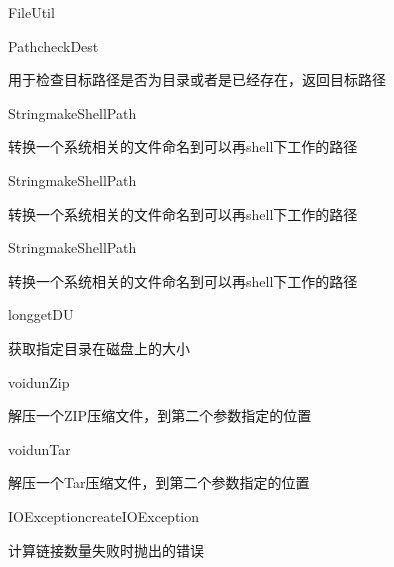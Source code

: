 \begin{XeClass}{FileUtil}
    \begin{XeMethod}{\XePrivate}{Path}{checkDest}
         
 用于检查目标路径是否为目录或者是已经存在，返回目标路径

    \end{XeMethod}

    \begin{XeMethod}{\XePublic}{String}{makeShellPath}
         
 转换一个系统相关的文件命名到可以再shell下工作的路径

    \end{XeMethod}

    \begin{XeMethod}{\XePublic}{String}{makeShellPath}
         
 转换一个系统相关的文件命名到可以再shell下工作的路径

    \end{XeMethod}

    \begin{XeMethod}{\XePublic}{String}{makeShellPath}
         
 转换一个系统相关的文件命名到可以再shell下工作的路径

    \end{XeMethod}

    \begin{XeMethod}{\XePublic}{long}{getDU}
         
 获取指定目录在磁盘上的大小

    \end{XeMethod}

    \begin{XeMethod}{\XePublic}{void}{unZip}
         
 解压一个ZIP压缩文件，到第二个参数指定的位置

    \end{XeMethod}

    \begin{XeMethod}{\XePublic}{void}{unTar}
         
 解压一个Tar压缩文件，到第二个参数指定的位置

    \end{XeMethod}

    \begin{XeMethod}{\XePrivate}{IOException}{createIOException}
         
 计算链接数量失败时抛出的错误

    \end{XeMethod}


\end{XeClass}
